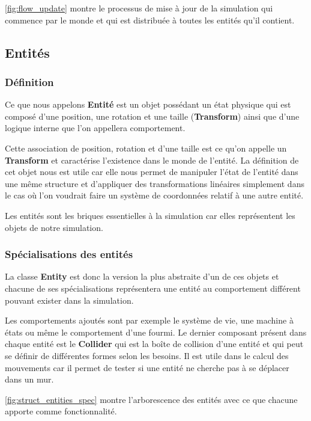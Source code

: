 \documentclass{EPUProjetDi}
\begin{document}
\autoref{fig:flow_update} montre le processus de mise à jour de la simulation qui commence par le monde et 
qui est distribuée à toutes les entités qu'il contient.

\pagebreak
\subsection{Entités}

\subsubsection*{Définition}

Ce que nous appelons \textbf{Entité} est un objet possédant un état physique qui est composé d'une position, une rotation et une taille (\textbf{Transform}) 
ainsi que d'une logique interne que l'on appellera comportement.

Cette association de position, rotation et d'une taille est ce qu'on appelle un \textbf{Transform} et caractérise l'existence dans le monde de l'entité.
La définition de cet objet nous est utile car elle nous permet de manipuler l'état de l'entité dans une même structure et d'appliquer des transformations
linéaires simplement dans le cas où l'on voudrait faire un système de coordonnées relatif à une autre entité.

Les entités sont les briques essentielles à la simulation car elles représentent les objets de notre simulation. 

\subsubsection*{Spécialisations des entités}

La classe \textbf{Entity} est donc la version la plus abstraite d'un de ces objets et chacune de ses spécialisations
représentera une entité au comportement différent pouvant exister dans la simulation.

Les comportements ajoutés sont par exemple le système de vie, une machine à états ou même le comportement d'une fourmi.
Le dernier composant présent dans chaque entité est le \textbf{Collider} qui est la boîte de collision d'une entité et qui peut se définir 
de différentes formes selon les besoins. Il est utile dans le calcul des mouvements car il permet de tester si une entité ne cherche pas 
à se déplacer dans un mur.

\autoref{fig:struct_entities_spec} montre l'arborescence des entités avec ce que chacune apporte comme fonctionnalité.
\end{document}
